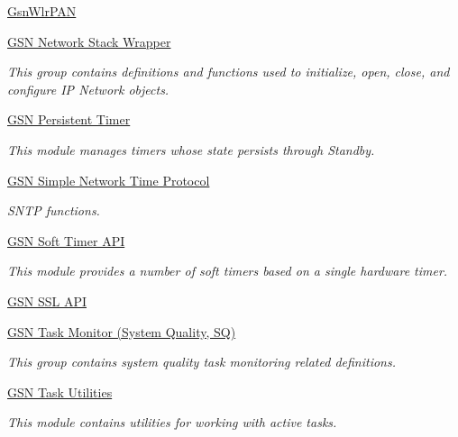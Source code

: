 \begin{DoxyCompactItemize}
\item 
\hyperlink{a00669}{GsnWlrPAN}
\item 
\hyperlink{a00670}{GSN Network Stack Wrapper}


\begin{DoxyCompactList}\small\item\em This group contains definitions and functions used to initialize, open, close, and configure IP Network objects. \end{DoxyCompactList}

\item 
\hyperlink{a00671}{GSN Persistent Timer}


\begin{DoxyCompactList}\small\item\em This module manages timers whose state persists through Standby. \end{DoxyCompactList}

\item 
\hyperlink{a00672}{GSN Simple Network Time Protocol}


\begin{DoxyCompactList}\small\item\em SNTP functions. \end{DoxyCompactList}

\item 
\hyperlink{a00673}{GSN Soft Timer API}


\begin{DoxyCompactList}\small\item\em This module provides a number of soft timers based on a single hardware timer. \end{DoxyCompactList}

\item 
\hyperlink{a00674}{GSN SSL API}
\item 
\hyperlink{a00675}{GSN Task Monitor (System Quality, SQ)}


\begin{DoxyCompactList}\small\item\em This group contains system quality task monitoring related definitions. \end{DoxyCompactList}

\item 
\hyperlink{a00676}{GSN Task Utilities}


\begin{DoxyCompactList}\small\item\em This module contains utilities for working with active tasks. \end{DoxyCompactList}


\end{DoxyCompactItemize}
